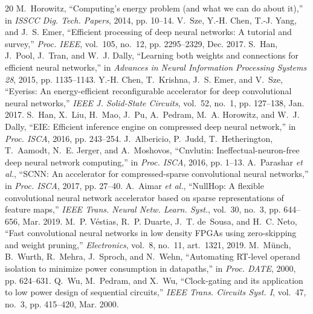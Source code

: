 \documentclass[11pt,journal,draftclsnofoot,onecolumn]{IEEEtran}
\begin{document}
\begin{thebibliography}{20}
 M.~Horowitz, ``Computing's energy problem (and what we can do about it),'' in \emph{ISSCC Dig. Tech. Papers}, 2014, pp. 10--14.
 V.~Sze, Y.-H. Chen, T.-J. Yang, and J.~S. Emer, ``Efficient processing of deep neural networks: A tutorial and survey,'' \emph{Proc. IEEE}, vol.~105, no.~12, pp. 2295--2329, Dec. 2017.
 S.~Han, J.~Pool, J.~Tran, and W.~J. Dally, ``Learning both weights and connections for efficient neural networks,'' in \emph{Advances in Neural Information Processing Systems 28}, 2015, pp. 1135--1143. %
 Y.-H. Chen, T.~Krishna, J.~S. Emer, and V.~Sze, ``Eyeriss: An energy-efficient reconfigurable accelerator for deep convolutional neural networks,'' \emph{IEEE J. Solid-State Circuits}, vol.~52, no.~1, pp. 127--138, Jan. 2017. %
 S.~Han, X.~Liu, H.~Mao, J.~Pu, A.~Pedram, M.~A. Horowitz, and W.~J. Dally, ``EIE: Efficient inference engine on compressed deep neural network,'' in \emph{Proc. ISCA}, 2016, pp. 243--254.
 J.~Albericio, P.~Judd, T.~Hetherington, T.~Aamodt, N.~E. Jerger, and A.~Moshovos, ``Cnvlutin: Ineffectual-neuron-free deep neural network computing,'' in \emph{Proc. ISCA}, 2016, pp. 1--13.
 A.~Parashar \emph{et al.}, ``SCNN: An accelerator for compressed-sparse convolutional neural networks,'' in \emph{Proc. ISCA}, 2017, pp. 27--40.
 A.~Aimar \emph{et al.}, ``NullHop: A flexible convolutional neural network accelerator based on sparse representations of feature maps,'' \emph{IEEE Trans. Neural Netw. Learn. Syst.}, vol.~30, no.~3, pp. 644--656, Mar. 2019.
 M.~P. V\'estias, R.~P. Duarte, J.~T. de~Sousa, and H.~C. Neto, ``Fast convolutional neural networks in low density FPGAs using zero-skipping and weight pruning,'' \emph{Electronics}, vol.~8, no.~11, art.~1321, 2019.
 M.~M{\"u}nch, B.~Wurth, R.~Mehra, J.~Sproch, and N.~Wehn, ``Automating RT-level operand isolation to minimize power consumption in datapaths,'' in \emph{Proc. DATE}, 2000, pp. 624--631.
 Q.~Wu, M.~Pedram, and X.~Wu, ``Clock-gating and its application to low power design of sequential circuits,'' \emph{IEEE Trans. Circuits Syst. I}, vol.~47, no.~3, pp. 415--420, Mar. 2000.

\end{thebibliography}
\end{document}
